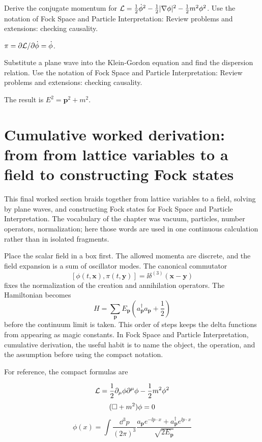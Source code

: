 \begin{exercise}
Derive the conjugate momentum for \(\mathcal L=\frac12\dot\phi^2-\frac12|\nabla\phi|^2-\frac12m^2\phi^2\).  Use the notation of Fock Space and Particle Interpretation: Review problems and extensions: checking causality.
\begin{answer}
\(\pi=\partial\mathcal L/\partial\dot\phi=\dot\phi\).
\end{answer}
\end{exercise}

\begin{exercise}
Substitute a plane wave into the Klein-Gordon equation and find the dispersion relation.  Use the notation of Fock Space and Particle Interpretation: Review problems and extensions: checking causality.
\begin{answer}
The result is \(E^2=\bm p^2+m^2\).
\end{answer}
\end{exercise}



\section{Cumulative worked derivation: from from lattice variables to a field to constructing Fock states}

This final worked section braids together from lattice variables to a field, solving by plane waves, and constructing Fock states for Fock Space and Particle Interpretation.  The vocabulary of the chapter was vacuum, particles, number operators, normalization; here those words are used in one continuous calculation rather than in isolated fragments.

Place the scalar field in a box first.  The allowed momenta are discrete, and the field expansion is a sum of oscillator modes.  The canonical commutator
\[
  [\phi(t,\bm x),\pi(t,\bm y)]=\ii\delta^{(3)}(\bm x-\bm y)
\]
fixes the normalization of the creation and annihilation operators.  The Hamiltonian becomes
\[
  H=\sum_{\bm p}E_{\bm p}\left(a_{\bm p}^\dagger a_{\bm p}+\frac12\right)
\]
before the continuum limit is taken.  This order of steps keeps the delta functions from appearing as magic constants.  In Fock Space and Particle Interpretation, cumulative derivation, the useful habit is to name the object, the operation, and the assumption before using the compact notation.

For reference, the compact formulas are

\[
  \mathcal L=\frac12\partial_\mu\phi\partial^\mu\phi-\frac12m^2\phi^2
\]
\[
  (\Box+m^2)\phi=0
\]
\[
  \phi(x)=\int\frac{\dd^3p}{(2\pi)^3}\frac{a_{\bm p}e^{-\ii p\cdot x}+a_{\bm p}^\dagger e^{\ii p\cdot x}}{\sqrt{2E_{\bm p}}}
\]

